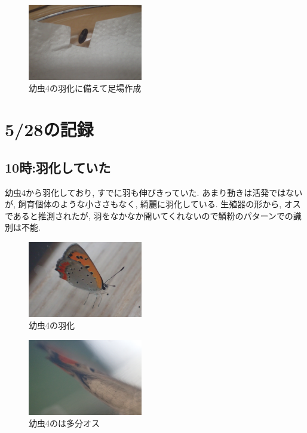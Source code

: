 \documentclass{jsarticle}
\begin{document}
\begin{figure}[htbp]
  \begin{center}
    \includegraphics[width=5cm]{photo11/Larva4-pupa3.JPG}
  \end{center}
  \caption{幼虫4の羽化に備えて足場作成}
\end{figure}

\section{5/28の記録}
\subsection{10時:羽化していた}
幼虫4から羽化しており, すでに羽も伸びきっていた. 
あまり動きは活発ではないが, 飼育個体のような小ささもなく, 綺麗に羽化している. 
生殖器の形から, オスであると推測されたが, 羽をなかなか開いてくれないので鱗粉のパターンでの識別は不能. 

\begin{figure}[htbp]
  \begin{center}
    \includegraphics[width=5cm]{photo12/Larva4-emergence1.JPG}
  \end{center}
  \caption{幼虫4の羽化}
\end{figure}

\begin{figure}[htbp]
  \begin{center}
    \includegraphics[width=5cm]{photo12/Larva4-abdomen.JPG}
  \end{center}
  \caption{幼虫4のは多分オス}
\end{figure}
\end{document}
